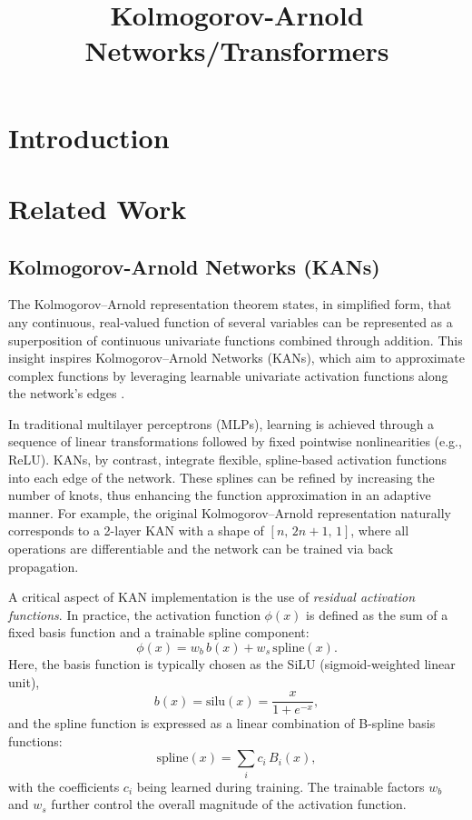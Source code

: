 \documentclass[conference]{IEEEtran}
\title{\Huge Kolmogorov-Arnold Networks/Transformers}
\author{
    \IEEEauthorblockN{
        Dimitrios Georgoulopoulos, \textbf{03120008},\,
        Ioannis Karaparisis, \textbf{03120866},\,
        Ioakeim El-Hattab Bistrogiannis, \textbf{03120058},\\
        Panagiotis-Alexios Spanakis, \textbf{03400274},\,
        Gregory Trakas, \textbf{03400274}
    }
}
\begin{document}
\maketitle

\begin{abstract}

\end{abstract}

\begin{IEEEkeywords}
\end{IEEEkeywords}

\section{Introduction}

\section{Related Work}

\subsection{Kolmogorov-Arnold Networks (KANs)}

The Kolmogorov–Arnold representation theorem states, in simplified form, that
any continuous, real‐valued function of several variables can be represented as
a superposition of continuous univariate functions combined through addition.
This insight inspires Kolmogorov–Arnold Networks (KANs), which aim to
approximate complex functions by leveraging learnable univariate activation
functions along the network’s edges \cite{kans}.

In traditional multilayer perceptrons (MLPs), learning is achieved through a
sequence of linear transformations followed by fixed pointwise nonlinearities
(e.g., ReLU). KANs, by contrast, integrate flexible, spline‐based activation
functions into each edge of the network. These splines can be refined by
increasing the number of knots, thus enhancing the function approximation in an
adaptive manner. For example, the original Kolmogorov–Arnold representation
naturally corresponds to a 2-layer KAN with a shape of \([n,\,2n+1,\,1]\),
where all operations are differentiable and the network can be trained via back
propagation.

A critical aspect of KAN implementation is the use of \emph{residual activation
    functions}. In practice, the activation function \(\phi(x)\) is defined as the
sum of a fixed basis function and a trainable spline component:
\[
    \phi(x) = w_b\,b(x) + w_s\,\text{spline}(x).
\]
Here, the basis function is typically chosen as the SiLU (sigmoid-weighted
linear unit),
\[
    b(x) = \text{silu}(x) = \frac{x}{1+e^{-x}},
\]
and the spline function is expressed as a linear combination of B-spline basis
functions:
\[
    \text{spline}(x) = \sum_i c_i\,B_i(x),
\]
with the coefficients \(c_i\) being learned during training. The trainable
factors \(w_b\) and \(w_s\) further control the overall magnitude of the
activation function.
\end{document}
